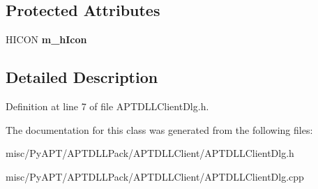 \subsection*{Protected Attributes}
\begin{DoxyCompactItemize}
\item 
H\+I\+C\+ON {\bfseries m\+\_\+h\+Icon}\hypertarget{class_c_a_p_t_d_l_l_client_dlg_a369e499f9bc4bd2568f911e955a4006a}{}\label{class_c_a_p_t_d_l_l_client_dlg_a369e499f9bc4bd2568f911e955a4006a}

\end{DoxyCompactItemize}


\subsection{Detailed Description}


Definition at line 7 of file A\+P\+T\+D\+L\+L\+Client\+Dlg.\+h.



The documentation for this class was generated from the following files\+:\begin{DoxyCompactItemize}
\item 
misc/\+Py\+A\+P\+T/\+A\+P\+T\+D\+L\+L\+Pack/\+A\+P\+T\+D\+L\+L\+Client/A\+P\+T\+D\+L\+L\+Client\+Dlg.\+h\item 
misc/\+Py\+A\+P\+T/\+A\+P\+T\+D\+L\+L\+Pack/\+A\+P\+T\+D\+L\+L\+Client/A\+P\+T\+D\+L\+L\+Client\+Dlg.\+cpp\end{DoxyCompactItemize}

